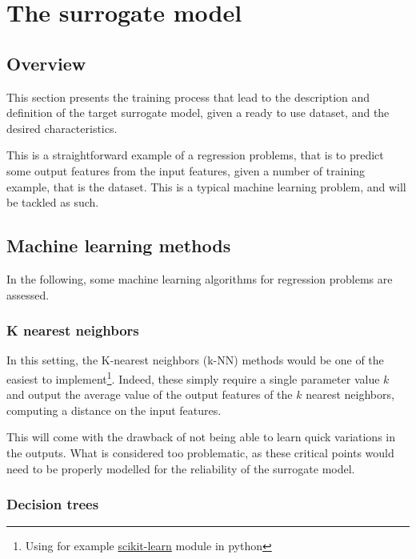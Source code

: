 \section{The surrogate model}

\subsection{Overview}

This section presents the training process that lead to the description and definition of the target surrogate model, given a ready to use dataset, and the desired characteristics.

This is a straightforward example of a regression problems, that is to predict some output features from the input features, given a number of training example, that is the dataset. This is a typical machine learning problem, and will be tackled as such.

\subsection{Machine learning methods}

In the following, some machine learning algorithms for regression problems \cite{machine-learning-class} are assessed.

\subsubsection{K nearest neighbors}

In this setting, the K-nearest neighbors (k-NN) methods would be one of the easiest to implement\footnote{Using for example \href{https://scikit-learn.org/stable/modules/neighbors.html\#nearest-neighbors-regression}{scikit-learn}\cite{scikit-learn} module in python}. Indeed, these simply require a single parameter value $k$ and output the average value of the output features of the $k$ nearest neighbors, computing a distance on the input features.

This will come with the drawback of not being able to learn quick variations in the outputs. What is considered too problematic, as these critical points would need to be properly modelled for the reliability of the surrogate model.

\subsubsection{Decision trees}


